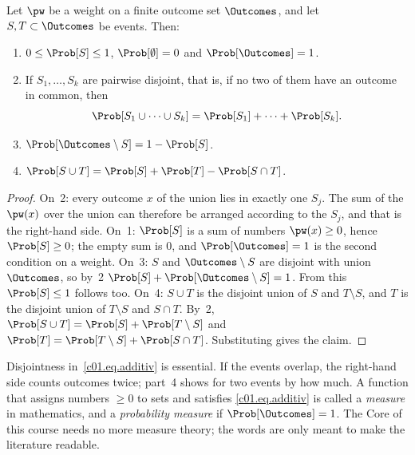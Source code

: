 \begin{proposition}\label{c01.prop.wahrscheinlichkeit}
  Let $\pw$ be a weight on a finite outcome set $\Outcomes$, and let
  $S, T \subset \Outcomes$ be events. Then:
  \begin{enumerate}
    \item $0 \leq \Prob[S] \leq 1$, $\Prob[\emptyset] = 0$ and $\Prob[\Outcomes] = 1$.
    \item If $S_1, \dots, S_k$ are pairwise disjoint, that is, if no two of them have an
      outcome in common, then
      \begin{equation}\label{c01.eq.additiv}
        \Prob[S_1 \cup \dots \cup S_k] = \Prob[S_1] + \dots + \Prob[S_k] .
      \end{equation}
    \item $\Prob[\Outcomes \setminus S] = 1 - \Prob[S]$.
    \item $\Prob[S \cup T] = \Prob[S] + \Prob[T] - \Prob[S \cap T]$.
  \end{enumerate}
\end{proposition}
\begin{proof}
  On~2: every outcome $x$ of the union lies in exactly one $S_j$. The sum of the
  $\pw(x)$ over the union can therefore be arranged according to the $S_j$, and that is the
  right-hand side. On~1: $\Prob[S]$ is a sum of numbers $\pw(x) \geq 0$, hence
  $\Prob[S] \geq 0$; the empty sum is $0$, and $\Prob[\Outcomes] = 1$ is the second
  condition on a weight. On~3: $S$ and $\Outcomes \setminus S$ are disjoint with
  union $\Outcomes$, so by~2 $\Prob[S] + \Prob[\Outcomes \setminus S] = 1$.
  From this $\Prob[S] \leq 1$ follows too. On~4: $S \cup T$ is the disjoint union of
  $S$ and $T \setminus S$, and $T$ is the disjoint union of $T \setminus S$ and
  $S \cap T$. By~2, $\Prob[S \cup T] = \Prob[S] + \Prob[T \setminus S]$ and
  $\Prob[T] = \Prob[T \setminus S] + \Prob[S \cap T]$. Substituting gives the claim.
\end{proof}

Disjointness in~\eqref{c01.eq.additiv} is essential. If the events overlap, the right-hand
side counts outcomes twice; part~4 shows for two events by how much.
A function that assigns numbers $\geq 0$ to sets and satisfies \eqref{c01.eq.additiv} is called
a \emph{measure} in mathematics, and a \emph{probability measure} if
$\Prob[\Outcomes] = 1$. The Core of this course needs no more measure theory; the words
are only meant to make the literature readable.

